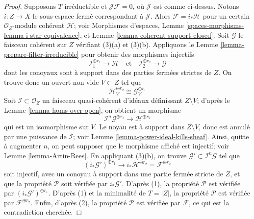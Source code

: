 \begin{proof}
\medskip\noindent
Supposons $T$ irréductible et $\mathcal{J}\mathcal{F} = 0$, où
$\mathcal{J}$ est comme ci-dessus. Notons $i : Z \to X$ le sous-espace fermé
correspondant à $\mathcal{J}$. Alors $\mathcal{F} = i_*\mathcal{H}$
pour un certain $\mathcal{O}_Z$-module cohérent $\mathcal{H}$; voir
Morphismes d'espaces, Lemme \ref{spaces-morphisms-lemma-i-star-equivalence},
et Lemme \ref{lemma-coherent-support-closed}.
Soit $\mathcal{G}$ le faisceau cohérent sur $Z$ vérifiant
(3)(a) et (3)(b). Appliquons le Lemme \ref{lemma-prepare-filter-irreducible}
pour obtenir des morphismes injectifs
$$
\mathcal{I}_1^{\oplus r_1} \to \mathcal{H}
\quad\text{et}\quad
\mathcal{I}_2^{\oplus r_2} \to \mathcal{G}
$$
dont les conoyaux sont à support dans des parties fermées strictes de $Z$. On trouve donc
un ouvert non vide $V \subset Z$ tel que
$$
\mathcal{H}^{\oplus r_2}_V \cong \mathcal{G}^{\oplus r_1}_V
$$
Soit $\mathcal{I} \subset \mathcal{O}_Z$ un faisceau quasi-cohérent d'idéaux
définissant $Z \setminus V$; d'après
le Lemme \ref{lemma-homs-over-open}, on obtient
un morphisme
$$
\mathcal{I}^n\mathcal{G}^{\oplus r_1} \longrightarrow \mathcal{H}^{\oplus r_2}
$$
qui est un isomorphisme sur $V$. Le noyau est à support dans $Z \setminus V$,
donc est annulé par une puissance de $\mathcal{I}$; voir
Lemme \ref{lemma-power-ideal-kills-sheaf}. Ainsi, quitte à augmenter
$n$, on peut supposer que le morphisme affiché est injectif; voir
Lemme \ref{lemma-Artin-Rees}. En appliquant (3)(b), on trouve
$\mathcal{G}' \subset \mathcal{I}^n\mathcal{G}$ tel que
$$
(i_*\mathcal{G}')^{\oplus r_1} \longrightarrow
i_*\mathcal{H}^{\oplus r_2} = \mathcal{F}^{\oplus r_2}
$$
soit injectif, avec un conoyau à support dans une partie fermée stricte de $Z$,
et que la propriété $\mathcal{P}$ soit vérifiée par $i_*\mathcal{G}'$.
D'après (1), la propriété $\mathcal{P}$ est vérifiée par $(i_*\mathcal{G}')^{\oplus r_1}$.
D'après (1) et la minimalité de $T = |Z|$, la propriété $\mathcal{P}$ est vérifiée par
$\mathcal{F}^{\oplus r_2}$. Enfin, d'après (2), la propriété $\mathcal{P}$
est vérifiée par $\mathcal{F}$, ce qui est la contradiction cherchée.
\end{proof}

